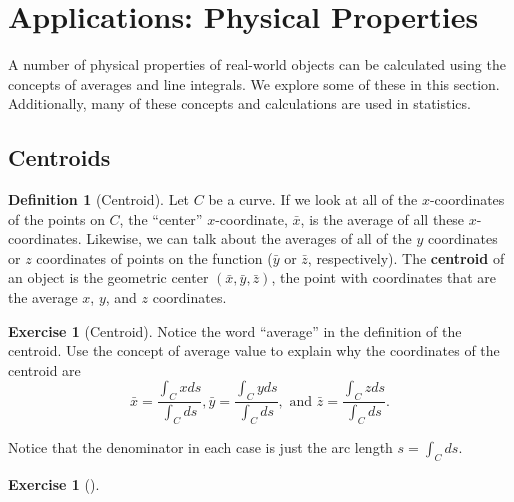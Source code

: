 \documentclass[10pt,]{book}
\newcommand{\terminology}[1]{\textbf{#1}}
\theoremstyle{plain}
\theoremstyle{definition}
\newtheorem{definition}[theorem]{Definition}
\theoremstyle{definition}
\theoremstyle{definition}
\theoremstyle{definition}
\newtheorem{exploration}[project]{Exercise}
\theoremstyle{definition}
\numberwithin{equation}{section}
\begin{document}
\typeout{************************************************}
\typeout{************************************************}
\section[{Applications: Physical Properties}]{Applications: Physical Properties}\label{section-33}
A number of physical properties of real-world objects can be calculated using the concepts of averages and line integrals. We explore some of these in this section. Additionally, many of these concepts and calculations are used in statistics.%
\typeout{************************************************}
\typeout{************************************************}
\subsection[{Centroids}]{Centroids}\label{subsection-29}
\begin{definition}[{Centroid}]\label{definition-37}
Let \(C\) be a curve. If we look at all of the \(x\)-coordinates of the points on \(C\), the ``center'' \(x\)-coordinate, \(\bar x\), is the average of all these \(x\)-coordinates. Likewise, we can talk about the averages of all of the \(y\) coordinates or \(z\) coordinates of points on the function (\(\bar y\) or \(\bar z\), respectively). The \terminology{centroid} of an object is the geometric center \((\bar x, \bar y, \bar z)\), the point with coordinates that are the average \(x\), \(y\), and \(z\) coordinates.%
\end{definition}
\begin{exploration}[Centroid]\label{prob_centroid_of_curve}
Notice the word ``average'' in the definition of the centroid. Use the concept of average value to explain why the coordinates of the centroid are %
\begin{equation*}
\bar x = \frac{\int_C x ds}{\int_C  ds},
\bar y = \frac{\int_C y ds}{\int_C  ds}, 
\text{ and } 
\bar z = \frac{\int_C z ds}{\int_C  ds}.
\end{equation*}
%
\par
Notice that the denominator in each case is just the arc length \(s=\int_C ds\).%
\end{exploration}
\begin{exploration}[]\label{prob_semicircle_centroid}
\end{exploration}
\typeout{************************************************}
\typeout{************************************************}
\end{document}
